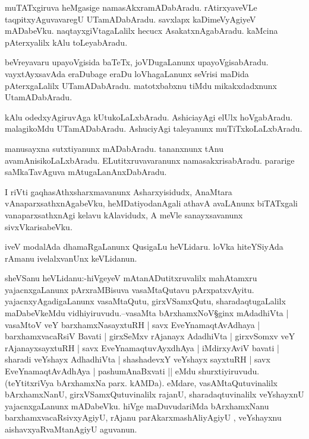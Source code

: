 \documentclass{article}
\begin{document}
\begin{mn}%
muTATxgiruva heMgasige namasAkxramADabAradu. rAtirxyaveVLe taqpitxyAguvavaregU 
UTamADabAradu. savxlapx kaDimeVyAgiyeV mADabeVku. naqtayxgiVtagaLalilx hecucx 
AsakatxnAgabAradu. kaMcina pAterxyalilx kAlu toLeyabAradu.
\end{mn}

\begin{mn}%
beVreyavaru upayoVgisida baTeTx, joVDugaLanunx upayoVgisabAradu. vayxtAyxsavAda eraDubage 
eraDu loVhagaLanunx seVrisi maDida pAterxgaLalilx UTamADabAradu. matotxbabxnu tiMdu 
mikakxdadxnunx UtamADabAradu.
\end{mn}

\begin{mn}%
kAlu odedxyAgiruvAga kUtukoLaLxbAradu. AshiciayAgi elUlx hoVgabAradu. malagikoMdu 
UTamADabAradu. AshuciyAgi taleyanunx muTiTxkoLaLxbAradu.
\end{mn}

\begin{mn}%
manusayxna sutxtiyanunx mADabAradu. tananxnunx tAnu avamAnisikoLaLxbAradu. 
ELutitxruvavaranunx namasakxrisabAradu. pararige saMkaTavAguva mAtugaLanAnxDabAradu.
\end{mn}

\begin{mn}%
I riVti gaqhasAthxsharxmavanunx Asharxyisidudx, AnaMtara vAnaparxsathxnAgabeVku, 
heMDatiyodanAgali athavA avaLAnunx biTATxgali vanaparxsathxnAgi kelavu kAlavidudx, A meVle 
sanayxsavanunx sivxVkarisabeVku.
\end{mn}

\begin{mn}%
iveV modalAda dhamaRgaLanunx QusigaLu heVLidaru. loVka hiteYSiyAda rAmanu ivelalxvanUnx 
keVLidanun.
\end{mn}


\begin{mn}%
sheVSanu heVLidanu:-hiVgeyeV mAtanADutitxruvalilx mahAtamxru yajacnxgaLanunx pArxraMBisuva 
vasaMtaQutavu pArxpatxvAyitu.\\

yajacnxyAgadigaLanunx vasaMtaQutu, girxVSamxQutu, sharadaqtugaLalilx maDabeVkeMdu 
vidhiyiruvudu.--vasaMta bArxhamxNoV\S ginx mAdadhiVta | vasaMtoV veY barxhamxNasayxtuRH | 
savx EveYnamaqtAvAdhaya | barxhamxvacaRsiV Bavati | girxSeMxv rAjanayx AdadhiVta | girxvSomxv
veY rAjanayxsayxtuRH | savx EveYnamaqtuvAyxdhAya | iMdirxyAviV bavati | sharadi veYshayx 
AdhadhiVta | shashadevxY veYshayx sayxtuRH | savx EveYnamaqtAvAdhAya | pashumAnaBxvati ||
eMdu shurxtiyiruvudu. (teYtitxriVya bArxhamxNa parx. kAMDa). eMdare, vasAMtaQutuvinalilx 
bArxhamxNanU, girxVSamxQutuvinalilx rajanU, sharadaqtuvinalilx veYshayxnU yajacnxgaLanunx 
mADabeVku. hiVge maDuvudariMda bArxhamxNanu barxhamxvacaRsivxyAgiyU, rAjanu 
parAkarxmashAliyAgiyU , veYshayxnu aishavxyaRvaMtanAgiyU aguvanun.
\end{mn}
\end{document}
